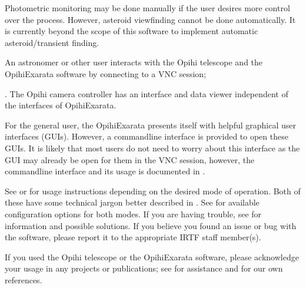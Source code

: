 \documentclass[letterpaper,11pt,english]{sphinxmanual}
\begin{document}
\sphinxAtStartPar
Photometric monitoring may be done manually if the user desires more control
over the process. However, asteroid view\sphinxhyphen{}finding cannot be done automatically.
It is currently beyond the scope of this software to implement automatic
asteroid/transient finding.

\sphinxAtStartPar
An astronomer or other user interacts with the Opihi telescope and the
OpihiExarata software by connecting to a VNC session; %
\begin{footnote}[2]\sphinxAtStartFootnote
{}
%
\end{footnote}.
The Opihi camera controller has an interface and data viewer independent of
the interfaces of OpihiExarata.

\sphinxAtStartPar
For the general user, the OpihiExarata presents itself with helpful graphical
user interfaces (GUIs). However, a command\sphinxhyphen{}line interface is provided to
open these GUIs. It is likely that most users do not need to worry about this
interface as the GUI may already be open for them in the VNC session, however,
the command\sphinxhyphen{}line interface and its usage is documented in
{\hyperref[\detokenize{user/command_line:user-command-line}]{}}.

\sphinxAtStartPar
See {\hyperref[\detokenize{user/manual_mode:user-manual-mode}]{}} or {\hyperref[\detokenize{user/automatic_mode:user-automatic-mode}]{}} for usage instructions
depending on the desired mode of operation. Both of these have some technical
jargon better described in {\hyperref[\detokenize{user/system_framework:user-system-framework}]{}}. See
{\hyperref[\detokenize{user/configuration:user-configuration}]{}} for available configuration options for both modes.
If you are having trouble, see {\hyperref[\detokenize{user/troubleshooting:user-troubleshooting}]{}} for information and
possible solutions. If you believe you found an issue or bug with the software,
please report it to the appropriate IRTF staff member(s).

\sphinxAtStartPar
If you used the Opihi telescope or the OpihiExarata software, please
acknowledge your usage in any projects or publications; see
{\hyperref[\detokenize{user/citations:user-citations}]{}} for assistance and for our own references.
\end{document}
